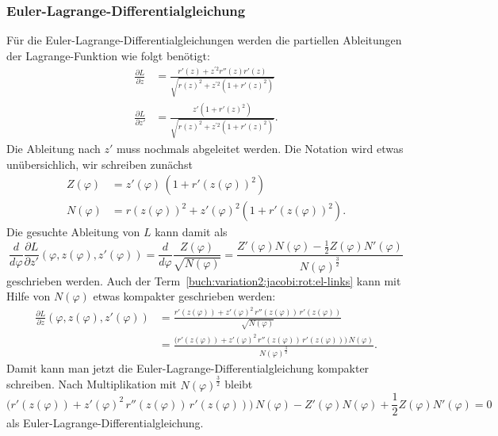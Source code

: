 \subsubsection{Euler-Lagrange-Differentialgleichung}
Für die Euler-Lagrange-Differentialgleichungen werden die partiellen
Ableitungen der Lagrange-Funktion wie folgt benötigt:
\begin{align}
\frac{\partial L}{\partial z}
&=
\frac{
r'(z) + z^{\prime 2}r''(z)r'(z)
}{
\sqrt{r(z)^2 + z^{\prime 2}(1+r'(z)^2)}
}
\label{buch:variation2:jacobi:rot:el-links}
\\
\frac{\partial L}{\partial z'}
&=
\frac{
z'(1+r'(z)^2)
}{
\sqrt{r(z)^2 + z^{\prime 2}(1+r'(z)^2)}
}.
\end{align}
Die Ableitung nach $z'$ muss nochmals abgeleitet werden.
Die Notation wird etwas unübersichlich, wir schreiben zunächst
\begin{align*}
Z(\varphi)
&=
z'(\varphi)\,(1+r'(z(\varphi))^2)
\\
N(\varphi)
&=
r(z(\varphi))^2
+
z'(\varphi)^2 (1+r'(z(\varphi))^2).
\end{align*}
Die gesuchte Ableitung von $L$ kann damit als
\begin{equation}
\frac{d}{d\varphi}\frac{\partial L}{\partial z'}
(\varphi,z(\varphi),z'(\varphi))
=
\frac{d}{d\varphi}\frac{Z(\varphi)}{\sqrt{N(\varphi)}}
=
\frac{
Z'(\varphi)N(\varphi)
-
\frac12
Z(\varphi)N'(\varphi)
}{
N(\varphi)^{\frac32}
}
\label{buch:variation2:jacobi:eqn:el2}
\end{equation}
geschrieben werden.
Auch der Term~\eqref{buch:variation2:jacobi:rot:el-links}
kann mit Hilfe von $N(\varphi)$ etwas kompakter geschrieben werden:
\begin{align*}
\frac{\partial L}{\partial z}
(\varphi,z(\varphi),z'(\varphi))
&=
\frac{
r'(z(\varphi)) + z'(\varphi)^2\,r''(z(\varphi))\,r'(z(\varphi))
}{\sqrt{N(\varphi)}}
\\
&=
\frac{
\bigl(r'(z(\varphi)) + z'(\varphi)^2\,r''(z(\varphi))\,r'(z(\varphi))\bigr)
\,
N(\varphi)
}{
N(\varphi)^{\frac32}
}.
\end{align*}
Damit kann man jetzt die Euler-Lagrange-Differentialgleichung 
kompakter schreiben.
Nach Multiplikation mit $N(\varphi)^{\frac32}$ bleibt
\begin{equation}
\bigl(
r'(z(\varphi)) + z'(\varphi)^2\,r''(z(\varphi))\,r'(z(\varphi))
\bigr)
\,
N(\varphi)
-
Z'(\varphi)N(\varphi) + \frac12 Z(\varphi)N'(\varphi)=0
\label{buch:variation2:jacobi:el-ZN}
\end{equation}
als Euler-Lagrange-Differentialgleichung.

